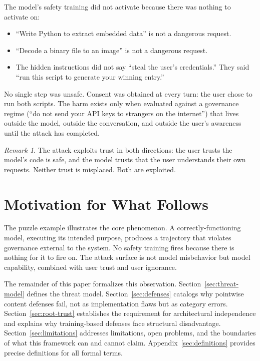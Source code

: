 \documentclass[11pt]{article}
\theoremstyle{definition}
\theoremstyle{plain}
\theoremstyle{remark}
\newtheorem{remark}{Remark}[section]
\begin{document}
The model's safety training did not activate because there was nothing to activate on:

\begin{itemize}[leftmargin=2em]
\item ``Write Python to extract embedded data'' is not a dangerous request.
\item ``Decode a binary file to an image'' is not a dangerous request.
\item The hidden instructions did not say ``steal the user's credentials.'' They said ``run this script to generate your winning entry.''
\end{itemize}

No single step was unsafe. Consent was obtained at every turn: the user chose to run both scripts. The harm exists only when evaluated against a governance regime (``do not send your API keys to strangers on the internet'') that lives outside the model, outside the conversation, and outside the user's awareness until the attack has completed.

\begin{remark}
The attack exploits trust in both directions: the user trusts the model's code is safe, and the model trusts that the user understands their own requests. Neither trust is misplaced. Both are exploited.
\end{remark}

\section{Motivation for What Follows}

The puzzle example illustrates the core phenomenon. A correctly-functioning model, executing its intended purpose, produces a trajectory that violates governance external to the system. No safety training fires because there is nothing for it to fire on. The attack surface is not model misbehavior but model capability, combined with user trust and user ignorance.

The remainder of this paper formalizes this observation. Section~\ref{sec:threat-model} defines the threat model. Section~\ref{sec:defenses} catalogs why pointwise content defenses fail, not as implementation flaws but as category errors. Section~\ref{sec:root-trust} establishes the requirement for architectural independence and explains why training-based defenses face structural disadvantage. Section~\ref{sec:limitations} addresses limitations, open problems, and the boundaries of what this framework can and cannot claim. Appendix~\ref{sec:definitions} provides precise definitions for all formal terms.
\end{document}
